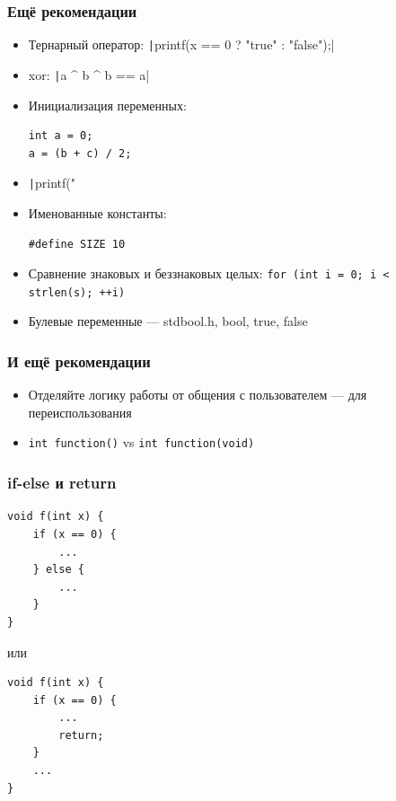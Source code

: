 \documentclass{../../slides-style}
\begin{document}
    \begin{frame}[fragile]
        \frametitle{Ещё рекомендации}
        \begin{itemize}
            \item Тернарный оператор: \texttt|printf(x == 0 ? "true" :  "false");|
            \item xor: \texttt|a ^ b ^ b == a|
            \item Инициализация переменных:
                \begin{verbatim}
int a = 0;
a = (b + c) / 2;
                \end{verbatim}
            \item \texttt|printf("%
            \item Именованные константы: 
                \begin{verbatim}
#define SIZE 10
                \end{verbatim}
            \item Сравнение знаковых и беззнаковых целых: \texttt{for (int i = 0; i < strlen(s); ++i)}
            \item Булевые переменные --- stdbool.h, bool, true, false
        \end{itemize}
    \end{frame}

    \begin{frame}[fragile]
        \frametitle{И ещё рекомендации}
        \begin{itemize}
            \item Отделяйте логику работы от общения с пользователем --- для переиспользования
            \item \texttt{int function()} vs \texttt{int function(void)}
        \end{itemize}
    \end{frame}

    \begin{frame}[fragile]
        \frametitle{if-else и return}
        \begin{verbatim}
void f(int x) {
    if (x == 0) {
        ...
    } else {
        ...
    }
}
        \end{verbatim}
        или
        \begin{verbatim}
void f(int x) {
    if (x == 0) {
        ...
        return;
    } 
    ...
}
        \end{verbatim}
    \end{frame}
\end{document}
